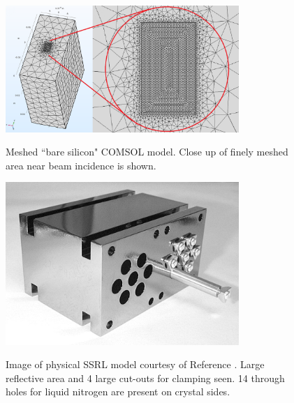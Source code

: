 \documentclass{iucr}
\begin{document}


\begin{figure}
\caption{Meshed ``bare silicon" COMSOL model. Close up of finely meshed area near beam incidence is shown.}
\includegraphics[width = 8.85cm]{images/bare_silicon.png}
\label{fig:bare_silicon}
\end{figure}


\begin{figure}
\caption{Image of physical SSRL model courtesy of Reference \cite{stanford}. Large reflective area and 4 large cut-outs for clamping seen. 14 through holes for liquid nitrogen are present on crystal sides.}
\includegraphics[width = 8.85cm]{images/ssrlsilicon.jpg}
\label{fig:ssrl_silicon}
\end{figure}


\end{document}
